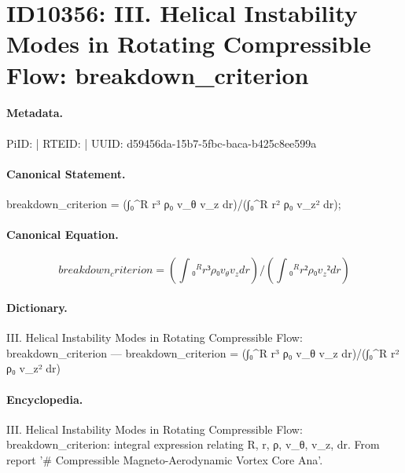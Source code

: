 \section*{ID10356: III. Helical Instability Modes in Rotating Compressible Flow: breakdown\_criterion}
\paragraph{Metadata.}
PiID:  | RTEID:  | UUID: d59456da-15b7-5fbc-baca-b425c8ee599a

\paragraph{Canonical Statement.}
breakdown\_criterion = (∫₀\textasciicircum{}R r³ ρ₀ v\_θ v\_z dr)/(∫₀\textasciicircum{}R r² ρ₀ v\_z² dr);

\paragraph{Canonical Equation.}
\[
breakdown_criterion = (∫₀^R r³ ρ₀ v_θ v_z dr)/(∫₀^R r² ρ₀ v_z² dr)
\]

\paragraph{Dictionary.}
III. Helical Instability Modes in Rotating Compressible Flow: breakdown\_criterion — breakdown\_criterion = (∫₀\textasciicircum{}R r³ ρ₀ v\_θ v\_z dr)/(∫₀\textasciicircum{}R r² ρ₀ v\_z² dr)

\paragraph{Encyclopedia.}
III. Helical Instability Modes in Rotating Compressible Flow: breakdown\_criterion: integral expression relating R, r, ρ, v\_θ, v\_z, dr. From report '\# Compressible Magneto-Aerodynamic Vortex Core Ana'.
